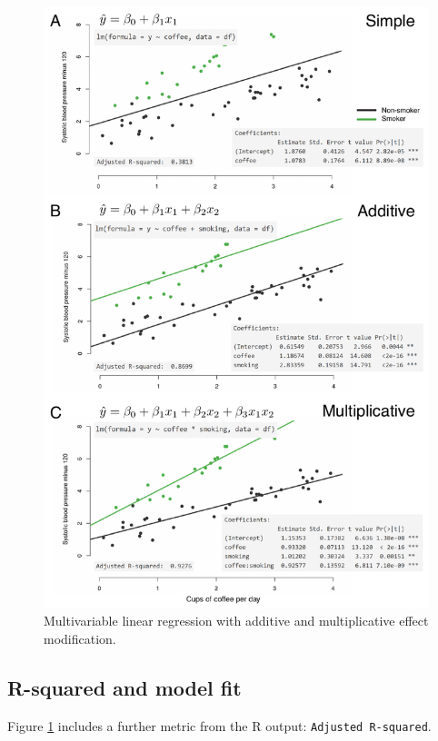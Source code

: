 \documentclass[
  12pt,
  krantz2]{krantz}
\begin{document}
\begin{figure}
\centering
\includegraphics{images/chapter07/6_types.pdf}
\caption{\label{fig:chap07-fig-types}Multivariable linear regression with additive and multiplicative effect modification.}
\end{figure}

\hypertarget{r-squared-and-model-fit}{%
\subsection{R-squared and model fit}\label{r-squared-and-model-fit}}


Figure \ref{fig:chap07-fig-types} includes a further metric from the R output: \texttt{Adjusted\ R-squared}.
\end{document}
